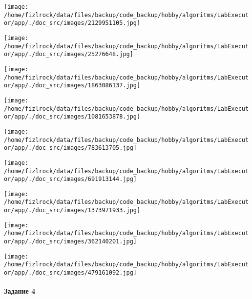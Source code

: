 \documentclass[a4paper, 12pt]{article}
\begin{document}
\texttt{[image: /home/fizlrock/data/files/backup/code\_backup/hobby/algoritms/LabExecutor/app/./doc\_src/images/2129951105.jpg]}

\texttt{[image: /home/fizlrock/data/files/backup/code\_backup/hobby/algoritms/LabExecutor/app/./doc\_src/images/25276648.jpg]}

\texttt{[image: /home/fizlrock/data/files/backup/code\_backup/hobby/algoritms/LabExecutor/app/./doc\_src/images/1863086137.jpg]}

\texttt{[image: /home/fizlrock/data/files/backup/code\_backup/hobby/algoritms/LabExecutor/app/./doc\_src/images/1081653878.jpg]}

\texttt{[image: /home/fizlrock/data/files/backup/code\_backup/hobby/algoritms/LabExecutor/app/./doc\_src/images/783613705.jpg]}

\texttt{[image: /home/fizlrock/data/files/backup/code\_backup/hobby/algoritms/LabExecutor/app/./doc\_src/images/691913144.jpg]}

\texttt{[image: /home/fizlrock/data/files/backup/code\_backup/hobby/algoritms/LabExecutor/app/./doc\_src/images/1373971933.jpg]}

\texttt{[image: /home/fizlrock/data/files/backup/code\_backup/hobby/algoritms/LabExecutor/app/./doc\_src/images/362140201.jpg]}

\texttt{[image: /home/fizlrock/data/files/backup/code\_backup/hobby/algoritms/LabExecutor/app/./doc\_src/images/479161092.jpg]}
\pagebreak
\paragraph{Задание 4}
\end{document}
